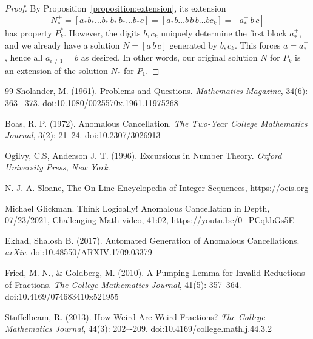 \documentclass[sn-mathphys]{sn-jnl}%
\theoremstyle{thmstyleone}%
\newtheorem{corollary}[theorem]{Corollary}
\theoremstyle{thmstyletwo}%
\theoremstyle{thmstylethree}%
\begin{document}
\begin{appendices}
\begin{proof}
     By Proposition~\ref{proposition:extension}, its extension \[
        N_*^+ = [a_*b_*\dots b_*\, b_*\,b_*\dots b_*c] = 
        [a_*b\dots b\, b\, b\dots b c_k] = [a_*^+\, b\, c]
    \] has property $P^*_k$. However, the digits $b, c_k$ uniquely determine the 
    first block $a_*^+$, and we already have a solution $N = [a\, b\, c]$ generated 
    by $b, c_k$. This forces $a = a_*^+$, hence all $a_{i \neq 1} = b$ as desired.
    In other words, our original solution $N$ for $P_k$ is an extension of the 
    solution $N_*$ for $P_1$.
\end{proof}



\end{appendices}


% 
\begin{thebibliography}{99}
 Sholander, M. (1961). Problems and Questions. \textit{Mathematics Magazine}, 34(6): 363–-373. doi:10.1080/0025570x.1961.11975268

 Boas, R. P. (1972). Anomalous Cancellation. \textit{The Two-Year College Mathematics Journal}, 3(2): 21--24.
doi:10.2307/3026913

 Ogilvy, C.S, Anderson J. T. (1996). Excursions in Number Theory. \textit{Oxford University Press, New York}.

 N. J. A. Sloane, The On Line Encyclopedia of Integer Sequences, https://oeis.org

 Michael Glickman. Think Logically! 
Anomalous Cancellation in Depth, 07/23/2021, Challenging Math video, 41:02, https://youtu.be/0\_PCqkbGs5E

 Ekhad, Shalosh B. (2017). Automated Generation of Anomalous Cancellations. \textit{arXiv}. doi:10.48550/ARXIV.1709.03379


 Fried, M. N., \& Goldberg, M. (2010). A Pumping Lemma for Invalid Reductions of Fractions.
\textit{The College Mathematics Journal}, 41(5): 357–364. 
doi:10.4169/074683410x521955

 Stuffelbeam, R. (2013). How Weird Are Weird Fractions? \textit{The College Mathematics Journal}, 44(3): 202–-209. doi:10.4169/college.math.j.44.3.2

\end{thebibliography}
\end{document}
